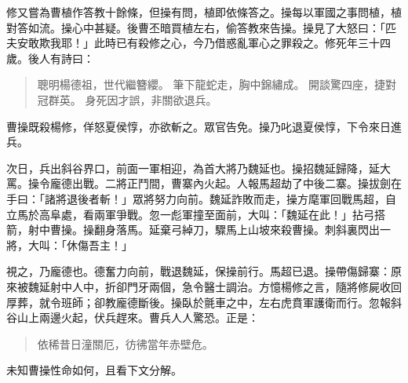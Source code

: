 修又嘗為曹植作答教十餘條，但操有問，植即依條答之。操每以軍國之事問植，植對答如流。操心中甚疑。後曹丕暗買植左右，偷答教來告操。操見了大怒曰：「匹夫安敢欺我耶！」此時已有殺修之心，今乃借惑亂軍心之罪殺之。修死年三十四歲。後人有詩曰：

\begin{quote}
聰明楊德祖，世代繼簪纓。
筆下龍蛇走，胸中錦繡成。
開談驚四座，捷對冠群英。
身死因才誤，非關欲退兵。
\end{quote}

曹操既殺楊修，佯怒夏侯惇，亦欲斬之。眾官告免。操乃叱退夏侯惇，下令來日進兵。

次日，兵出斜谷界口，前面一軍相迎，為首大將乃魏延也。操招魏延歸降，延大罵。操令龐德出戰。二將正鬥間，曹寨內火起。人報馬超劫了中後二寨。操拔劍在手曰：「諸將退後者斬！」眾將努力向前。魏延詐敗而走，操方麾軍回戰馬超，自立馬於高阜處，看兩軍爭戰。忽一彪軍撞至面前，大叫：「魏延在此！」拈弓搭箭，射中曹操。操翻身落馬。延棄弓綽刀，驟馬上山坡來殺曹操。刺斜裏閃出一將，大叫：「休傷吾主！」

視之，乃龐德也。德奮力向前，戰退魏延，保操前行。馬超已退。操帶傷歸寨：原來被魏延射中人中，折卻門牙兩個，急令醫士調治。方憶楊修之言，隨將修屍收回厚葬，就令班師；卻教龐德斷後。操臥於氈車之中，左右虎賁軍護衛而行。忽報斜谷山上兩邊火起，伏兵趕來。曹兵人人驚恐。正是：

\begin{quote}
依稀昔日潼關厄，彷彿當年赤壁危。
\end{quote}

未知曹操性命如何，且看下文分解。
